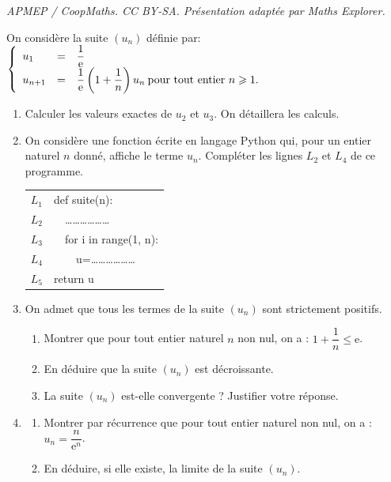 \documentclass[10pt]{article}
\providecommand{\e}{{\mathrm{e}}}
\begin{document}
\noindent\textit{APMEP / CoopMaths. CC BY-SA. Présentation adaptée par Maths Explorer.}\par\medskip
\medskip

On considère la suite $\left(u_{n}\right)$ définie par: $\left\{\begin{array}{l c l}
u_{1}&=&\dfrac{1}{\e} \\
u_{n+1}&=&\dfrac{1}{\e}\left(1+\dfrac{1}{n}\right) u_{n}\: \text {pour tout entier } n \geqslant 1.\end{array}\right.$

\begin{enumerate}
	\item Calculer les valeurs exactes de $u_{2}$ et $u_{3}$. On détaillera les calculs.

	\item On considère une fonction écrite en langage Python qui, pour un entier naturel $n$ donné, affiche le terme $u_{n}$. Compléter les lignes $L_{2}$ et $L_{4}$ de ce programme.

	\begin{center}
		\begin{tabular}{|c|>{\ttfamily}l|}
			\hline
			$L_{1}$ & def suite(n): \\
			$L_{2}$ & ~~\ldots \ldots \ldots \ldots \ldots \ldots \\
			$L_{3}$ & ~~for i in range(1, n): \\
			$L_{4}$ & ~~~~u=\ldots \ldots \ldots \ldots \ldots \ldots\\
			$L_{5}$ & return u \\
			\hline
		\end{tabular}
	\end{center}

	\item On admet que tous les termes de la suite $\left(u_{n}\right)$ sont strictement positifs.
	\begin{enumerate}
		\item Montrer que pour tout entier naturel $n$ non nul, on a : $1+\dfrac{1}{n} \leqslant \e$.

		\item En déduire que la suite $\left(u_{n}\right)$ est décroissante.
		\item La suite $\left(u_{n}\right)$ est-elle convergente ? Justifier votre réponse.
	\end{enumerate}

	\item \begin{enumerate}
		\item Montrer par récurrence que pour tout entier naturel non nul, on a : \quad $u_{n}=\dfrac{n}{\e^{n}}$.
		\item En déduire, si elle existe, la limite de la suite $\left(u_{n}\right)$.
	\end{enumerate}
\end{enumerate}
\end{document}
